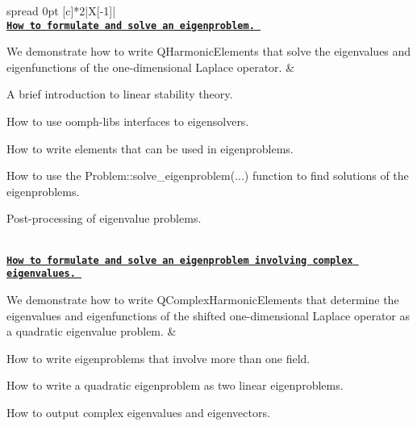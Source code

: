 \begin{longtabu} spread 0pt [c]{*{2}{|X[-1]}|}
\hline
{}\\
\label{_harmonic}%
 \href{../../eigenproblems/harmonic/html/index.html}{\tt {\bfseries  How to formulate and solve an eigenproblem.} }

We demonstrate how to write {\ttfamily Q\+Harmonic\+Elements} that solve the eigenvalues and eigenfunctions of the one-\/dimensional Laplace operator.  &
\begin{DoxyItemize}
\item A brief introduction to linear stability theory.
\item How to use {\ttfamily oomph-\/lib\textquotesingle{}s} interfaces to eigensolvers.
\item How to write elements that can be used in eigenproblems.
\item How to use the {\ttfamily Problem\+::solve\+\_\+eigenproblem}(...) function to find solutions of the eigenproblems.
\item Post-\/processing of eigenvalue problems. 
\end{DoxyItemize}



\\
\label{_complex harmonic}%
 \href{../../eigenproblems/complex_harmonic/html/index.html}{\tt {\bfseries  How to formulate and solve an eigenproblem involving complex eigenvalues.} }

We demonstrate how to write {\ttfamily Q\+Complex\+Harmonic\+Elements} that determine the eigenvalues and eigenfunctions of the shifted one-\/dimensional Laplace operator as a quadratic eigenvalue problem.  &
\begin{DoxyItemize}
\item How to write eigenproblems that involve more than one field.
\item How to write a quadratic eigenproblem as two linear eigenproblems.
\item How to output complex eigenvalues and eigenvectors. 
\end{DoxyItemize}



\\
\end{longtabu}


